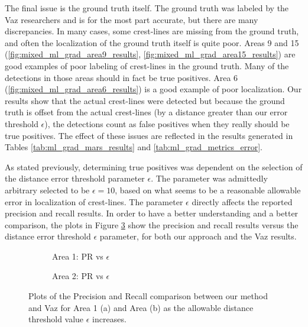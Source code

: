 The final issue is the ground truth itself. The ground truth was labeled by the Vaz researchers and is for the most part accurate, but there are many discrepancies. In many cases, some crest-lines are missing from the ground truth, and often the localization of the ground truth itself is quite poor. Areas 9 and 15 (\ref{fig:mixed_ml_grad_area9_results}, \ref{fig:mixed_ml_grad_area15_results}) are good examples of poor labeling of crest-lines in the ground truth. Many of the detections in those areas should in fact be true positives. Area 6 (\ref{fig:mixed_ml_grad_area6_results}) is a good example of poor localization. Our results show that the actual crest-lines were detected but because the ground truth is offset from the actual crest-lines (by a distance greater than our error threshold $\epsilon$), the detections count as false positives when they really should be true positives. The effect of these issues are reflected in the results generated in Tables \ref{tab:ml_grad_mars_results} and \ref{tab:ml_grad_metrics_error}.

As stated previously, determining true positives was dependent on the selection of the distance error threshold parameter $\epsilon$. The parameter was admittedly arbitrary selected to be $\epsilon = 10$, based on what seems to be a reasonable allowable error in localization of crest-lines. The parameter $\epsilon$ directly affects the reported precision and recall results. In order to have a better understanding and a better comparison, the plots in Figure \ref{fig:precision_recall_vs_epsilon} show the precision and recall results versus the distance error threshold $\epsilon$ parameter, for both our approach and the Vaz results.

\begin{figure}
	\centering
	\begin{subfigure}{0.48\textwidth}
		\centering
		\caption{ Area 1: PR vs $\epsilon$}
		\label{fig:precision_recall_vs_epsilon_area1}
	\end{subfigure}
	\begin{subfigure}{0.48\textwidth}
		\centering
		\caption{ Area 2: PR vs $\epsilon$}
		\label{fig:precision_recall_vs_epsilon_area2}
	\end{subfigure}
	\caption{ Plots of the Precision and Recall comparison between our method and Vaz \cite{vaz_object_based_dune_analysis} for Area 1 (a) and Area (b) as the allowable distance threshold value $\epsilon$ increases. }
	\label{fig:precision_recall_vs_epsilon}
\end{figure}

